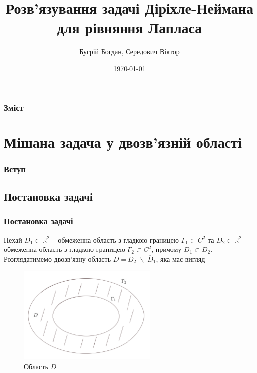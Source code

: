 \documentclass{beamer}
\title[Short title]{Розв'язування задачі Діріхле-Неймана для рівняння Лапласа} %
\author{Бугрій Богдан, Середович Віктор} %
\institute[UCLA] %
{
	Львівський національний університет імені Івана Франка \\
	Факультет прикладної математики та інформатики 
}
\date{\today} %
\numberwithin{equation}{section}
\begin{document}
	
	\begin{frame}
		\titlepage
	\end{frame}
	
	
	\begin{frame}
		\frametitle{Зміст}
		\tableofcontents
	\end{frame}

	\section{Мішана задача у двозв'язній області} 
	
	\begin{frame}
		\frametitle{Вступ}
	\end{frame}
	
	\subsection{Постановка задачі}
	
	\begin{frame}
		\frametitle{Постановка задачі}
		\small
		
		Нехай $D_1 \subset \mathbb{R}^2$ – обмеженна область з гладкою границею $\Gamma_1 \subset C^2$ та $D_2 \subset \mathbb{R}^2$ – обмеженна область з гладкою границею $\Gamma_2 \subset C^2$, причому $D_1 \subset D_2$. Розглядатимемо двозв'язну область $D = D_2 \; \backslash \; \overline{D}_1$, яка має вигляд
	
		\begin{figure}[h]
			\centering
			\includegraphics[width=0.6\textwidth]{resources/doubly-connected-region}
			
			\caption{Область $D$}
			\label{fig:double-connected-region}
		\end{figure}
	\end{frame}
	
\end{document}
